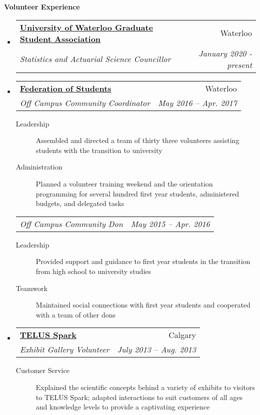 \documentclass[letterpaper,11pt]{article}
\makeatletter
\newcommand{\resheading}[1]{\colorbox{resBlue}{\begin{minipage}{\textwidth}
			\textbf{#1}
\end{minipage}} \vspace{-14pt}}
\newcommand{\resitem}[4]{\begin{tabular*}{17.5cm}{l@{\extracolsep{\fill}}r} \textbf{#1} & #2 \\ \textit{#3} & \textit{#4} \\ \end{tabular*} \vspace{-6pt}}
\newcommand{\ressubitem}[2]{\begin{tabular*}{17.5cm}{l@{\extracolsep{\fill}}r} \textit{#1} & \textit{#2} \\ \end{tabular*} \vspace{-6pt}}
\makeatother
\begin{document}
\begin{itemize}
\begin{comment}
			\end{description}}
\item
	\resitem{\href{https://www.calgarystampede.com/}{The Calgary Stampede}}{Calgary, AB}{Parking Attendant}{July 2011, July 2012}
		{\footnotesize \begin{description}
				\item[Teamwork] Managed parking at a surface lot with a team during the annual Calgary Exhibition and Stampede
				\item[Customer Service] Engaged positively with customers and other employees, garnering the Golden Pylon Award for excellence in customer service both years employed
			\end{description}}
\end{comment}
\end{itemize}

\resheading{Volunteer Experience}
\begin{itemize}
\item
	\resitem{\href{https://uwaterloo.ca/graduate-student-association/}{University of Waterloo Graduate Student Association}}{Waterloo}{Statistics and Actuarial Science Councillor}{January 2020 - present}
\item 
	\resitem{\href{https://feds.ca/}{Federation of Students}}{Waterloo}{Off Campus Community Coordinator}{May 2016 -- Apr. 2017}
		{\footnotesize \begin{description}
				\item[Leadership] Assembled and directed a team of thirty three volunteers assisting students with the transition to university
				\item[Administration] {Planned a volunteer training weekend and the orientation programming for several hundred first year students, administered budgets, and delegated tasks}
			\end{description}}
	\ressubitem{Off Campus Community Don}{May 2015 -- Apr. 2016}
		{\footnotesize \begin{description}
				\item[Leadership] Provided support and guidance to first year students in the transition from high school to university studies
				\item[Teamwork] Maintained social connections with first year students and cooperated with a team of other dons
			\end{description}}
\item
	\resitem{\href{http://www.sparkscience.ca/}{TELUS Spark}}{Calgary}{Exhibit Gallery Volunteer}{July 2013 -- Aug. 2013}
		{\footnotesize \begin{description}
			\item[Customer Service] Explained the scientific concepts behind a variety of exhibits to visitors to TELUS Spark; adapted interactions to suit customers of all ages and knowledge levels to provide a captivating experience
		\end{description}}
\end{itemize}
\end{document}
